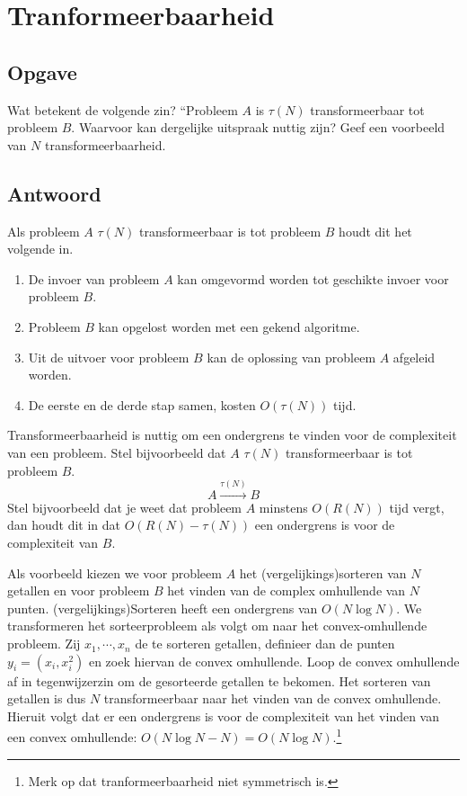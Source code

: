 \documentclass[examenvragen.tex]{subfiles}
\begin{document}
\section{Tranformeerbaarheid}
\subsection{Opgave}
Wat betekent de volgende zin? ``Probleem $A$ is $\tau(N)$ transformeerbaar tot probleem $B$. Waarvoor kan dergelijke uitspraak nuttig zijn? Geef een voorbeeld van $N$ transformeerbaarheid. 

\subsection{Antwoord}
Als probleem $A$ $\tau(N)$ transformeerbaar is tot probleem $B$ houdt dit het volgende in.
\begin{enumerate}
\item De invoer van probleem $A$ kan omgevormd worden tot geschikte invoer voor probleem $B$.
\item Probleem $B$ kan opgelost worden met een gekend algoritme.
\item Uit de uitvoer voor probleem $B$ kan de oplossing van probleem $A$ afgeleid worden.
\item De eerste en de derde stap samen, kosten $O(\tau(N))$ tijd.
\end{enumerate}
Transformeerbaarheid is nuttig om een ondergrens te vinden voor de complexiteit van een probleem.
Stel bijvoorbeeld dat $A$ $\tau(N)$ transformeerbaar is tot probleem $B$.
\[
A \overset{\tau(N)}{\rightarrow} B
\]
Stel bijvoorbeeld dat je weet dat probleem $A$ minstens $O(R(N))$ tijd vergt, dan houdt dit in dat $O(R(N)-\tau(N))$ een ondergrens is voor de complexiteit van $B$.

Als voorbeeld kiezen we voor probleem $A$ het (vergelijkings)sorteren van $N$ getallen en voor probleem $B$ het vinden van de complex omhullende van $N$ punten. (vergelijkings)Sorteren heeft een ondergrens van $O(N\log N)$. We transformeren het sorteerprobleem als volgt om naar het convex-omhullende probleem. Zij $x_1,\cdots, x_n$ de te sorteren getallen, definieer dan de punten $y_i = (x_i,x_i^2)$ en zoek hiervan de convex omhullende. Loop de convex omhullende af in tegenwijzerzin om de gesorteerde getallen te bekomen. Het sorteren van getallen is dus $N$ transformeerbaar naar het vinden van de convex omhullende. Hieruit volgt dat er een ondergrens is voor de complexiteit van het vinden van een convex omhullende: $O(N\log N - N) = O(N\log N)$.\footnote{Merk op dat tranformeerbaarheid niet symmetrisch is.}
\end{document}
